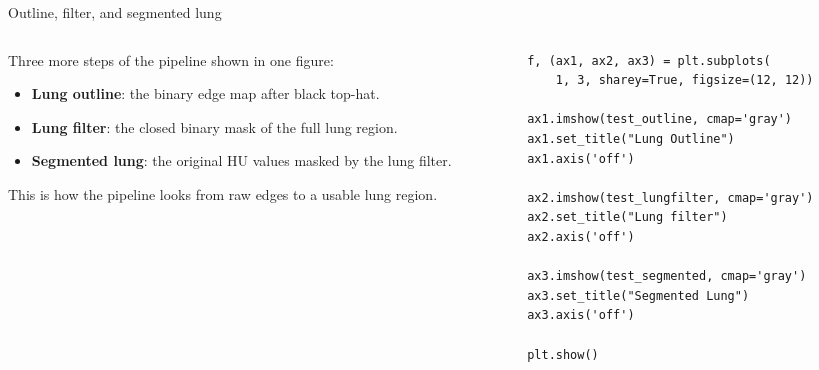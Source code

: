 \documentclass[10pt,aspectratio=169]{beamer}
\begin{document}
\begin{frame}[fragile]{Outline, filter, and segmented lung}
\begin{columns}[T,onlytextwidth]
\begin{column}{0.42\textwidth}
\small
Three more steps of the pipeline shown in one figure:
\begin{itemize}
  \item \textbf{Lung outline}: the binary edge map after black top-hat.
  \item \textbf{Lung filter}: the closed binary mask of the full lung region.
  \item \textbf{Segmented lung}: the original HU values masked by the lung filter.
\end{itemize}
This is how the pipeline looks from raw edges to a usable lung region.
\end{column}
\begin{column}{0.56\textwidth}
\begin{lstlisting}[firstnumber=last]
f, (ax1, ax2, ax3) = plt.subplots(
    1, 3, sharey=True, figsize=(12, 12))

ax1.imshow(test_outline, cmap='gray')
ax1.set_title("Lung Outline")
ax1.axis('off')

ax2.imshow(test_lungfilter, cmap='gray')
ax2.set_title("Lung filter")
ax2.axis('off')

ax3.imshow(test_segmented, cmap='gray')
ax3.set_title("Segmented Lung")
ax3.axis('off')

plt.show()
\end{lstlisting}
\end{column}
\end{columns}
\end{frame}
\end{document}
